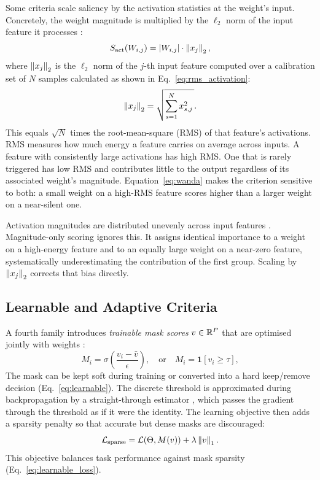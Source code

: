 Some criteria scale saliency by the activation statistics at the weight's
input. Concretely, the weight magnitude is multiplied by the $\ell_2$ norm of
the input feature it processes \cite{sun2023simple}:
\begin{equation}
	S_{\mathrm{act}}(W_{i,j}) = |W_{i,j}|\cdot\left\lVert x_j \right\rVert_2,
	\label{eq:wanda}
\end{equation}
where $\left\lVert x_j \right\rVert_2$ is the $\ell_2$ norm of the $j$-th input feature
computed over a calibration set of $N$ samples calculated as shown in Eq.~\eqref{eq:rms_activation}:
\begin{equation}
	\label{eq:rms_activation}
	\left\lVert x_j \right\rVert_2 = \sqrt{\sum_{s=1}^{N} x_{s,j}^2\,}.
\end{equation}
This equals $\sqrt{N}$ times the root-mean-square (RMS) of that feature's
activations. RMS measures how much energy a feature carries on average
across inputs. A feature with consistently large activations has high RMS.
One that is rarely triggered has low RMS and contributes little to the
output regardless of its associated weight's magnitude. Equation~\eqref{eq:wanda}
makes the criterion sensitive to both: a small weight on a high-RMS feature
scores higher than a larger weight on a near-silent one.

Activation magnitudes are distributed unevenly across input features
\cite{sun2023simple,wei2022outlier}. Magnitude-only scoring ignores this.
It assigns identical importance to a weight on a high-energy feature and to
an equally large weight on a near-zero feature, systematically
underestimating the contribution of the first group. Scaling by
$\left\lVert x_j \right\rVert_2$ corrects that bias directly.

\subsection{Learnable and Adaptive Criteria}
\label{subsec:learnable_adaptive_criteria}

A fourth family introduces \emph{trainable mask scores} $v \in \mathbb{R}^P$ that are optimised jointly with weights \cite{louizos2018learning,mallya2018packnet}:
\begin{equation}
	M_i = \sigma\!\left(\frac{v_i - \bar{v}}{\epsilon}\right),
	\quad
	\text{or}
	\quad
	M_i = \mathbf{1}[v_i \ge \tau],
	\label{eq:learnable}
\end{equation}
The mask can be kept soft during training or converted into a hard keep/remove decision (Eq.~\eqref{eq:learnable}). The discrete threshold is approximated during backpropagation by a straight-through estimator \cite{bengio2013estimating}, which passes the gradient through the threshold as if it were the identity. The learning objective then adds a sparsity penalty so that accurate but dense masks are discouraged:
\begin{equation}
	\mathcal{L}_{\mathrm{sparse}} = \mathcal{L}(\Theta, M(v)) + \lambda \left\lVert v \right\rVert_1.
	\label{eq:learnable_loss}
\end{equation}
This objective balances task performance against mask sparsity (Eq.~\eqref{eq:learnable_loss}).

